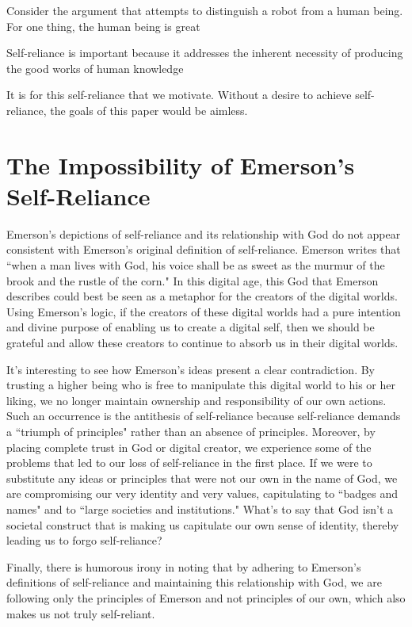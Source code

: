 \documentclass[12pt,letterpaper]{article}
\begin{document}
Consider the argument that attempts to distinguish a robot from a human being.  For one thing, the human being is great

Self-reliance is important because it addresses the inherent necessity of producing the good works of human knowledge  

It is for this self-reliance that we motivate.  Without a desire to achieve self-reliance, the goals of this paper would be aimless.
\fi

\section{The Impossibility of Emerson's Self-Reliance}

Emerson's depictions of self-reliance and its relationship with God do not appear consistent with Emerson's original definition of self-reliance.  Emerson writes that ``when a man lives with God, his voice shall be as sweet as the murmur of the brook and the rustle of the corn."  In this digital age, this God that Emerson describes could best be seen as a metaphor for the creators of the digital worlds.  Using Emerson's logic, if the creators of these digital worlds had a pure intention and divine purpose of enabling us to create a digital self, then we should be grateful and allow these creators to continue to absorb us in their digital worlds.

It's interesting to see how Emerson's ideas present a clear contradiction.  By trusting a higher being who is free to manipulate this digital world to his or her liking, we no longer maintain ownership and responsibility of our own actions.  Such an occurrence is the antithesis of self-reliance because self-reliance demands a ``triumph of principles" rather than an absence of principles.  Moreover, by placing complete trust in God or digital creator, we experience some of the problems that led to our loss of self-reliance in the first place.  If we were to substitute any ideas or principles that were not our own in the name of God, we are compromising our very identity and very values, capitulating to ``badges and names" and to ``large societies and institutions."  What's to say that God isn't a societal construct that is making us capitulate our own sense of identity, thereby leading us to forgo self-reliance?

Finally, there is humorous irony in noting that by adhering to Emerson's definitions of self-reliance and maintaining this relationship with God, we are following only the principles of Emerson and not principles of our own, which also makes us not truly self-reliant.
\end{document}
